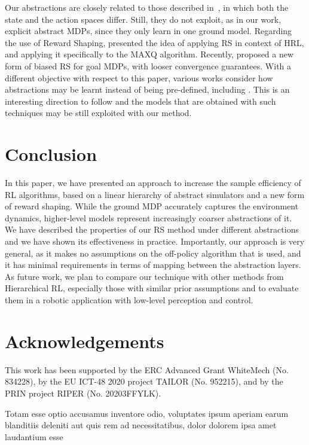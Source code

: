 \documentclass[letterpaper]{article} %
\theoremstyle{plain}
\theoremstyle{definition}
\theoremstyle{remark}
\begin{document}
Our abstractions are closely related to those described
in~\cite{abel_2016_OptimalBehavior, abel_2020_ValuePreserving},
in which both the state and the action spaces differ.
Still, they do not exploit, as in our work, explicit abstract MDPs,
since they only learn in one ground model.
%
Regarding the use of Reward Shaping, \cite{gao2015potential} presented the idea of
applying RS in context of HRL, and applying it specifically to the MAXQ
algorithm.
Recently, \cite{schubert_2021_PlanbasedRelaxed} proposed a new form of biased RS for goal MDPs, with looser convergence guarantees.
%
With a different objective with respect to this paper,
various works consider how abstractions may be learnt instead of being pre-defined, including
\cite{Marthi07automatic-shaping, grzes2008multigrid, steccanella_hierarchical_2021}.
This is an interesting direction to follow and the models that are obtained with such techniques may be still exploited with our method.


\section{Conclusion}

In this paper, we have presented an approach to increase the sample efficiency of RL algorithms,
based on a linear hierarchy of abstract simulators and a new form of reward shaping.
While the ground MDP accurately captures the environment dynamics,
higher-level models represent increasingly coarser abstractions of it.
We have described the properties of our RS method under different abstractions and we have shown its effectiveness in practice.
Importantly, our approach is very general, as it makes no assumptions on
the off-policy algorithm that is used, and it has minimal requirements in terms of mapping
between the abstraction layers.
As future work, we plan to compare our technique with other methods from Hierarchical RL,
especially those with similar prior assumptions and to evaluate them in a robotic application with low-level perception and control.


\section*{Acknowledgements}
This work has been supported by the ERC Advanced Grant WhiteMech (No. 834228),
by the EU ICT-48 2020 project TAILOR (No. 952215), and by the PRIN project
RIPER (No. 20203FFYLK).

Totam esse optio accusamus inventore odio, voluptates ipsum aperiam earum blanditiis deleniti aut quis rem ad necessitatibus, dolor dolorem ipsa amet laudantium esse

\end{document}
